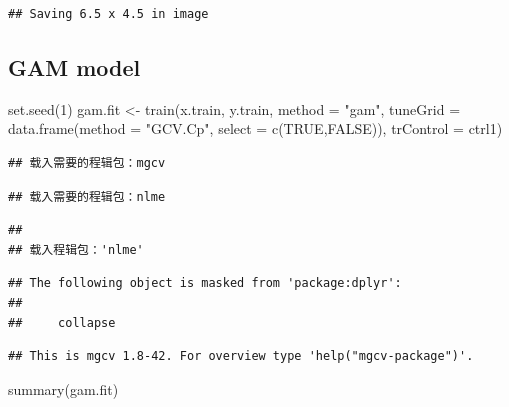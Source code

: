 \documentclass[
]{article}
\newenvironment{Shaded}{\begin{snugshade}}{\end{snugshade}}
\newcommand{\AttributeTok}[1]{\textcolor[rgb]{0.77,0.63,0.00}{#1}}
\newcommand{\ConstantTok}[1]{\textcolor[rgb]{0.00,0.00,0.00}{#1}}
\newcommand{\DecValTok}[1]{\textcolor[rgb]{0.00,0.00,0.81}{#1}}
\newcommand{\FunctionTok}[1]{\textcolor[rgb]{0.00,0.00,0.00}{#1}}
\newcommand{\NormalTok}[1]{#1}
\newcommand{\OtherTok}[1]{\textcolor[rgb]{0.56,0.35,0.01}{#1}}
\newcommand{\StringTok}[1]{\textcolor[rgb]{0.31,0.60,0.02}{#1}}
\begin{document}
\begin{verbatim}
## Saving 6.5 x 4.5 in image
\end{verbatim}

\hypertarget{gam-model}{%
\subsection{GAM model}\label{gam-model}}

\begin{Shaded}
\begin{Highlighting}[]
\FunctionTok{set.seed}\NormalTok{(}\DecValTok{1}\NormalTok{)}
\NormalTok{gam.fit }\OtherTok{\textless{}{-}} \FunctionTok{train}\NormalTok{(x.train, y.train,}
                 \AttributeTok{method =} \StringTok{"gam"}\NormalTok{,}
                 \AttributeTok{tuneGrid =} \FunctionTok{data.frame}\NormalTok{(}\AttributeTok{method =} \StringTok{"GCV.Cp"}\NormalTok{, }\AttributeTok{select =} \FunctionTok{c}\NormalTok{(}\ConstantTok{TRUE}\NormalTok{,}\ConstantTok{FALSE}\NormalTok{)),}
                 \AttributeTok{trControl =}\NormalTok{ ctrl1)}
\end{Highlighting}
\end{Shaded}

\begin{verbatim}
## 载入需要的程辑包：mgcv
\end{verbatim}

\begin{verbatim}
## 载入需要的程辑包：nlme
\end{verbatim}

\begin{verbatim}
## 
## 载入程辑包：'nlme'
\end{verbatim}

\begin{verbatim}
## The following object is masked from 'package:dplyr':
## 
##     collapse
\end{verbatim}

\begin{verbatim}
## This is mgcv 1.8-42. For overview type 'help("mgcv-package")'.
\end{verbatim}

\begin{Shaded}
\begin{Highlighting}[]
\FunctionTok{summary}\NormalTok{(gam.fit)}
\end{Highlighting}
\end{Shaded}
\end{document}
